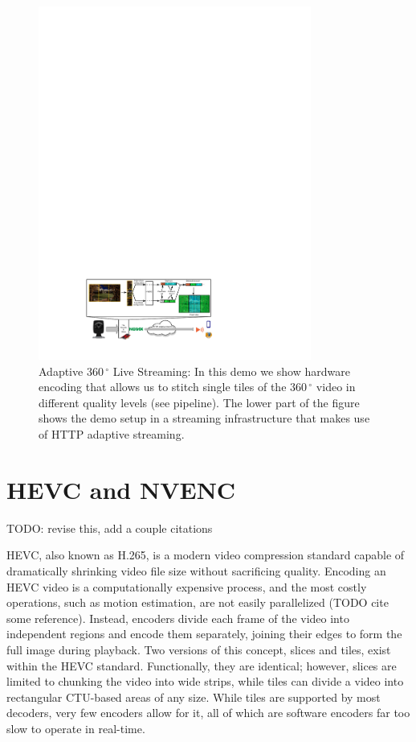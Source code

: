 \renewcommand{\figurename}{Fig.}
\begin{figure}[t]
	\centering
	\includegraphics[width=0.8\textwidth]{figures/Streaming_scenario_v3.pdf}
	\caption{Adaptive $360\,^{\circ}$ Live Streaming: In this demo we show hardware encoding that allows us to stitch single tiles of the $360\,^{\circ}$ video in different quality levels (see pipeline). The lower part of the figure shows the demo setup in a streaming infrastructure that makes use of HTTP adaptive streaming.}
\end{figure}

\section{HEVC and NVENC} \label{hevc}

TODO: revise this, add a couple citations

HEVC, also known as H.265, is a modern video compression standard capable of dramatically shrinking video file size without sacrificing quality. Encoding an HEVC video is a computationally expensive process, and the most costly operations, such as motion estimation, are not easily parallelized (TODO cite some reference). Instead, encoders divide each frame of the video into independent regions and encode them separately, joining their edges to form the full image during playback. Two versions of this concept, slices and tiles, exist within the HEVC standard. Functionally, they are identical; however, slices are limited to chunking the video into wide strips, while tiles can divide a video into rectangular CTU-based areas of any size. While tiles are supported by most decoders, very few encoders allow for it, all of which are software encoders far too slow to operate in real-time.


